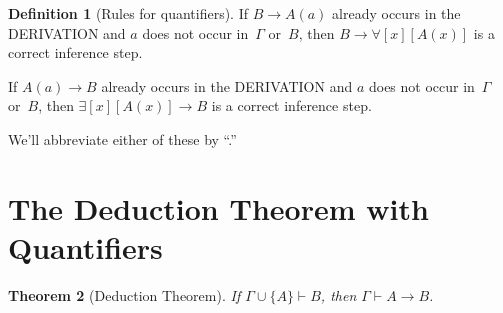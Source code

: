\documentclass[10pt,a4paper]{article}
\newcommand*{\olup}[1]{\MakeUppercase{#1}}
\theoremstyle{plain}
\newtheorem{thm}{Theorem}[section]
\theoremstyle{definition}
\newtheorem{defn}[thm]{Definition}
\theoremstyle{remark}
\newcommand*{\olfileid}[3]{}
\newcommand*{\olsection}[1]{\section*{#1}}
\newcommand*{\ollabel}[1]{\label{#1}}
\providecommand{\lif}{\mathbin{\rightarrow}}
\providecommand{\lforall}{\mathord{\forall}}
\providecommand{\lexists}{\mathord{\exists}}
\providecommand{\Proves}{\mathrel{\vdash}}
\providecommand{\QR}{\mathrm{QR}}
\begin{document}
\begin{defn}[Rules for quantifiers]
\item If $B \lif A(a)$ already occurs in the \olup{derivation} and $a$
  does not occur in~$\Gamma$ or~$B$, then $B \lif
  \lforall[x][A(x)]$ is a correct inference step.
\item If $A(a) \lif B$ already occurs in the \olup{derivation} and $a$
  does not occur in~$\Gamma$ or~$B$, then $\lexists[x][A(x)] \lif
  B$ is a correct inference step.
\end{defn}

We'll abbreviate either of these by ``\QR.''





\olfileid{fol}{axd}{ddq}

\olsection{The Deduction Theorem with Quantifiers}

\begin{thm}[Deduction Theorem]
\ollabel{thm:deduction-thm-q} If $\Gamma \cup \{A\} \Proves B$,
then $\Gamma \Proves A \lif B$.
\end{thm}
\end{document}
